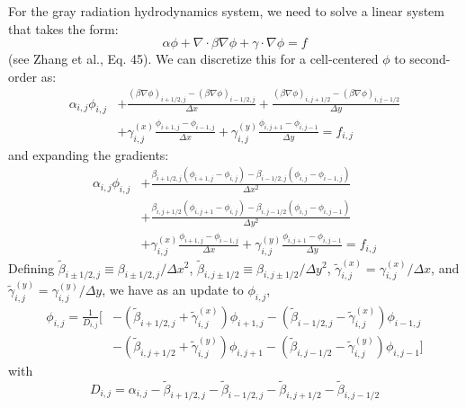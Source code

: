 For the gray radiation hydrodynamics system, we need to solve a
linear system that takes the form:
\begin{equation}
  \alpha \phi + \nabla \cdot \beta \nabla \phi + \gamma \cdot \nabla \phi = f
\end{equation}
(see Zhang et al., Eq. 45). 
We can discretize this for a cell-centered $\phi$ to second-order as:
\begin{align}
  \alpha_{i,j} \phi_{i,j} &+
  \frac{(\beta \nabla \phi)_{i+1/2,j} -
        (\beta \nabla \phi)_{i-1/2,j}}{\Delta x} +
  \frac{(\beta \nabla \phi)_{i,j+1/2} -
        (\beta \nabla \phi)_{i,j-1/2}}{\Delta y} \nonumber \\
  &+
  \gamma^{(x)}_{i,j} \frac{\phi_{i+1,j} - \phi_{i-1,j}}{\Delta x} +
  \gamma^{(y)}_{i,j} \frac{\phi_{i,j+1} - \phi_{i,j-1}}{\Delta y} = f_{i,j}
\end{align}
and expanding the gradients:
\begin{align}
  \alpha_{i,j} \phi_{i,j} &+
  \frac{\beta_{i+1/2,j} (\phi_{i+1,j} - \phi_{i,j}) -
        \beta_{i-1/2,j} (\phi_{i,j} - \phi_{i-1,j})}{\Delta x^2} \nonumber \\
 &+
  \frac{\beta_{i,j+1/2} (\phi_{i,j+1} - \phi_{i,j}) -
        \beta_{i,j-1/2} (\phi_{i,j} - \phi_{i,j-1})}{\Delta y^2} \nonumber \\
  &+
  \gamma^{(x)}_{i,j} \frac{\phi_{i+1,j} - \phi_{i-1,j}}{\Delta x} +
  \gamma^{(y)}_{i,j} \frac{\phi_{i,j+1} - \phi_{i,j-1}}{\Delta y} = f_{i,j}
\end{align}
Defining $\tilde{\beta}_{i\pm1/2,j} \equiv \beta_{i\pm1/2,j}/\Delta x^2$,
$\tilde{\beta}_{i,j\pm1/2} \equiv \beta_{i,j\pm1/2}/\Delta y^2$,
$\tilde{\gamma}^{(x)}_{i,j} = \gamma^{(x)}_{i,j}/\Delta x$,
and $\tilde{\gamma}^{(y)}_{i,j} = \gamma^{(y)}_{i,j}/\Delta y$, we have
as an update to $\phi_{i,j}$,
\begin{align}
\phi_{i,j} = \frac{1}{D_{i,j}} \bigg [
  &-(\tilde{\beta}_{i+1/2,j} + \tilde{\gamma}^{(x)}_{i,j}) \phi_{i+1,j}
   -(\tilde{\beta}_{i-1/2,j} - \tilde{\gamma}^{(x)}_{i,j}) \phi_{i-1,j}
  \nonumber \\
  &-(\tilde{\beta}_{i,j+1/2} + \tilde{\gamma}^{(y)}_{i,j}) \phi_{i,j+1}
   -(\tilde{\beta}_{i,j-1/2} - \tilde{\gamma}^{(y)}_{i,j}) \phi_{i,j-1}
   \bigg ]
\end{align}
with
\begin{equation}
D_{i,j} = \alpha_{i,j} - \tilde{\beta}_{i+1/2,j} - \tilde{\beta}_{i-1/2,j}
                       - \tilde{\beta}_{i,j+1/2} - \tilde{\beta}_{i,j-1/2}
\end{equation}            

